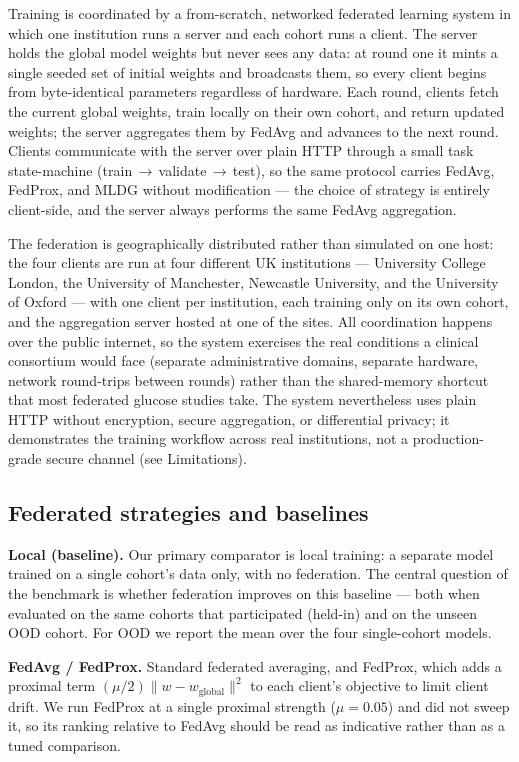 \documentclass[10pt,letterpaper]{article}
\begin{document}
Training is coordinated by a from-scratch, networked federated learning system
in which one institution runs a server and each cohort runs a client. The server
holds the global model weights but never sees any data: at round one it mints a
single seeded set of initial weights and broadcasts them, so every client begins
from byte-identical parameters regardless of hardware. Each round, clients fetch
the current global weights, train locally on their own cohort, and return updated
weights; the server aggregates them by FedAvg and advances to the next round.
Clients communicate with the server over plain HTTP through a small task
state-machine (train\,$\rightarrow$\,validate\,$\rightarrow$\,test), so the same
protocol carries FedAvg, FedProx, and MLDG without modification --- the choice of
strategy is entirely client-side, and the server always performs the same FedAvg
aggregation.

The federation is geographically distributed rather than simulated on one host:
the four clients are run at four different UK institutions --- University College
London, the University of Manchester, Newcastle University, and the University of
Oxford --- with one client per institution, each training only on its own cohort,
and the aggregation server hosted at one of the sites. All coordination happens
over the public internet, so the system exercises the real conditions a clinical
consortium would face (separate administrative domains, separate hardware,
network round-trips between rounds) rather than the shared-memory shortcut that
most federated glucose studies take. The system nevertheless uses plain HTTP
without encryption, secure aggregation, or differential privacy; it demonstrates
the training workflow across real institutions, not a production-grade secure
channel (see Limitations).

\subsection*{Federated strategies and baselines}

\textbf{Local (baseline).} Our primary comparator is local training: a separate
model trained on a single cohort's data only, with no federation. The central
question of the benchmark is whether federation improves on this baseline ---
both when evaluated on the same cohorts that participated (held-in) and on the
unseen OOD cohort. For OOD we report the mean over the four single-cohort models.

\textbf{FedAvg / FedProx.} Standard federated averaging, and FedProx, which adds
a proximal term $(\mu/2)\lVert w - w_{\text{global}}\rVert^2$ to each client's
objective to limit client drift. We run FedProx at a single proximal strength
($\mu=0.05$) and did not sweep it, so its ranking relative to FedAvg should be
read as indicative rather than as a tuned comparison.
\end{document}
